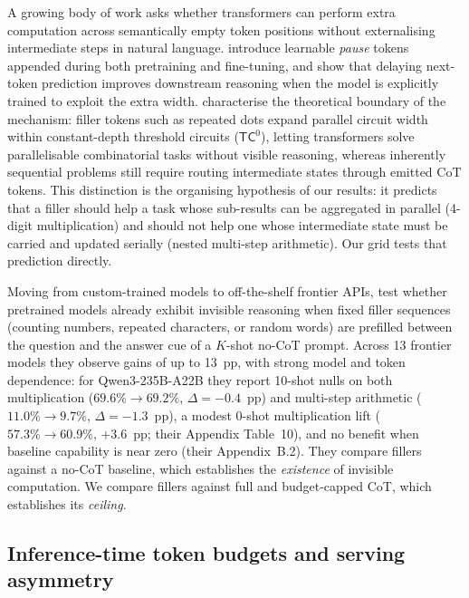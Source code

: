 \documentclass[11pt,a4paper]{article}
\begin{document}
A growing body of work asks whether transformers can perform extra computation
across semantically empty token positions without externalising intermediate
steps in natural language. \citet{goyal2024pause} introduce learnable
\emph{pause} tokens appended during both pretraining and fine-tuning, and show
that delaying next-token prediction improves downstream reasoning when the model
is explicitly trained to exploit the extra width. \citet{pfau2024dot}
characterise the theoretical boundary of the mechanism: filler tokens such as
repeated dots expand parallel circuit width within constant-depth threshold
circuits ($\mathsf{TC}^0$), letting transformers solve parallelisable
combinatorial tasks without visible reasoning, whereas inherently sequential
problems still require routing intermediate states through emitted CoT tokens.
This distinction is the organising hypothesis of our results: it predicts that a
filler should help a task whose sub-results can be aggregated in parallel
(4-digit multiplication) and should not help one whose intermediate state must be
carried and updated serially (nested multi-step arithmetic). Our grid tests that
prediction directly.

Moving from custom-trained models to off-the-shelf frontier APIs,
\citet{baherwani2026not} test whether pretrained models already exhibit invisible
reasoning when fixed filler sequences (counting numbers, repeated characters, or
random words) are prefilled between the question and the answer cue of a $K$-shot
no-CoT prompt. Across 13 frontier models they observe gains of up to 13~pp, with
strong model and token dependence: for Qwen3-235B-A22B they report 10-shot nulls
on both multiplication ($69.6\%\to69.2\%$, $\Delta=-0.4$~pp) and multi-step
arithmetic ($11.0\%\to9.7\%$, $\Delta=-1.3$~pp), a modest 0-shot multiplication
lift ($57.3\%\to60.9\%$, $+3.6$~pp; their Appendix Table~10), and no benefit when
baseline capability is near zero (their Appendix~B.2). They compare fillers
against a no-CoT baseline, which establishes the \emph{existence} of invisible
computation. We compare fillers against full and budget-capped CoT, which
establishes its \emph{ceiling}.

\subsection{Inference-time token budgets and serving asymmetry}
\end{document}
